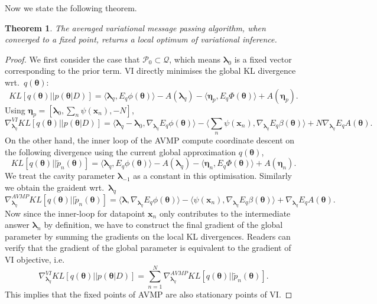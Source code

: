 \documentclass{article} %
\newtheorem{theorem}{Theorem}
\begin{document}
%
Now we state the following theorem. 
%
\begin{theorem}
The averaged variational message passing algorithm, when converged to a fixed point, returns a local optimum of variational inference.
\end{theorem}
\begin{proof}
We first consider the case that $\mathcal{P}_0 \subset \mathcal{Q}$, which means $\bm{\lambda}_0$ is a fixed vector corresponding to the prior term. VI directly minimises the global KL divergence wrt.~$q(\bm{\theta})$:
\begin{equation}
KL[q(\bm{\theta}) || p(\bm{\theta} | D)] = \langle \bm{\lambda}_q, E_q \phi(\bm{\theta}) \rangle - A(\bm{\lambda}_q) - \langle \bm{\eta}_p, E_q \Phi(\bm{\theta}) \rangle + A(\bm{\eta}_p).
\end{equation}
Using $\bm{\eta}_p = [\bm{\lambda}_0, \sum_{n} \psi(\bm{x}_n), -N]$,
\begin{equation}
\nabla_{\bm{\lambda}_q}^{VI} KL[q(\bm{\theta}) || p(\bm{\theta} | D)] = \langle \bm{\lambda}_q - \bm{\lambda}_0, \nabla_{\bm{\lambda}_q} E_q \phi(\bm{\theta}) \rangle - \langle \sum_{n} \psi(\bm{x}_n), \nabla_{\bm{\lambda}_q} E_q \beta(\bm{\theta}) \rangle + N \nabla_{\bm{\lambda}_q} E_q A(\bm{\theta}).
\end{equation}
On the other hand, the inner loop of the AVMP compute coordinate descent on the following divergence using the current global approximation $q(\bm{\theta})$,
\begin{equation}
KL[q(\bm{\theta}) || \tilde{p}_n(\bm{\theta})] = \langle \bm{\lambda}_q, E_q \phi(\bm{\theta}) \rangle - A(\bm{\lambda}_q) - \langle \bm{\eta}_n, E_q \Phi(\bm{\theta}) \rangle + A(\bm{\eta}_n).
\end{equation}
We treat the cavity parameter $\bm{\lambda}_{-1}$ as a constant in this optimisation. Similarly we obtain the graident wrt.~$\bm{\lambda}_q$
\begin{equation}
\nabla_{\bm{\lambda}_q}^{AVMP} KL[q(\bm{\theta}) || \tilde{p}_n(\bm{\theta})] = \langle \bm{\lambda}, \nabla_{\bm{\lambda}_q} E_q \phi(\bm{\theta}) \rangle - \langle \psi(\bm{x}_n), \nabla_{\bm{\lambda}_q} E_q \beta(\bm{\theta}) \rangle +  \nabla_{\bm{\lambda}_q} E_q A(\bm{\theta}).
\end{equation}
Now since the inner-loop for datapoint $\bm{x}_n$ only contributes to the intermediate answer $\bm{\lambda}_n$ by definition, we have to construct the final gradient of the global parameter by summing the gradients on the local KL divergences. Readers can verify that the gradient of the global parameter is equivalent to the gradient of VI objective, i.e.
\begin{equation}
\nabla_{\bm{\lambda}_q}^{VI} KL[q(\bm{\theta}) || p(\bm{\theta} | D)] = \sum_{n=1}^N \nabla_{\bm{\lambda}_q}^{AVMP} KL[q(\bm{\theta}) || \tilde{p}_n(\bm{\theta})].
\end{equation}
This implies that the fixed points of AVMP are also stationary points of VI.


\end{proof}
\end{document}
